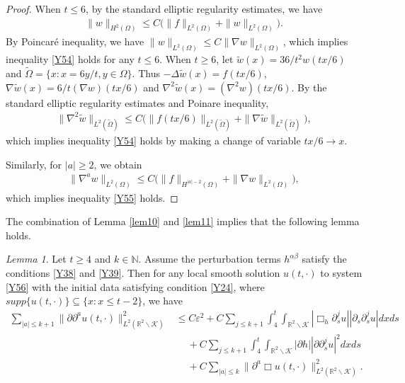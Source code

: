 \documentclass[11pt, reqno]{amsart}
\theoremstyle{definition}
\theoremstyle{remark}
\newtheorem{lem}[thm]{Lemma}
\theoremstyle{definition}
\numberwithin{equation}{section}
\numberwithin{equation}{section}
\def\leq{\leqslant}
\def\geq{\geqslant}
\begin{document}
\begin{proof}
When $t\leq6$, by the standard elliptic regularity estimates, we
have
\begin{align*}
\|w\|_{H^2(\Omega)}\leq
C\big(\|f\|_{L^2(\Omega)}+\|w\|_{L^2(\Omega)}\big).
\end{align*}
By Poincar\'{e} inequality, we have $\|w\|_{L^2(\Omega)}\leq C\|\nabla
w\|_{L^2(\Omega)}$, which implies inequality \eqref{Y54} holds for
any $t\leq6$. When $t\geq6$, let $\widetilde{w}(x)=36/t^2w(tx/6)$
and $\widetilde{\Omega}=\{x:x=6y/t,y\in\Omega\}$. Thus $-\Delta
\widetilde{w}(x)=f(tx/6)$, $\nabla\widetilde{w}(x)=6/t(\nabla
w)(tx/6)$ and $\nabla^2\widetilde{w}(x)=(\nabla^2 w)(tx/6)$. By the
standard elliptic regularity estimates and Poinare inequality,
\begin{align*}
\|\nabla^2\widetilde{w}\|_{L^2(\widetilde{\Omega})}\leq
C\big(\|f(tx/6)\|_{L^2(\widetilde{\Omega})}+\|\nabla
\widetilde{w}\|_{L^2(\widetilde{\Omega})}\big),
\end{align*}
which implies inequality \eqref{Y54} holds by making a change of
variable $tx/6\rightarrow x$.
\par Similarly, for $|a|\geq2$, we obtain
\begin{align*}
\|\nabla^aw\|_{L^2(\Omega)}\leq
C\big(\|f\|_{H^{|a|-2}(\Omega)}+\|\nabla w\|_{L^2(\Omega)}\big),
\end{align*}
which implies inequality \eqref{Y55} holds.
\end{proof}
The combination of Lemma \ref{lem10} and \ref{lem11} implies that the following lemma holds.
\begin{lem}\label{lem12}
Let $t\geq4$ and $k\in\mathbb N$.  Assume the perturbation terms
$h^{\alpha\beta}$ satisfy the conditions \eqref{Y38} and \eqref{Y39}.
Then for any local smooth solution $u(t,\cdot)$ to system \eqref{Y56}
with the initial data satisfying condition \eqref{Y24}, where
$supp\{u(t,\cdot)\}\subseteq\{x:x\leq t-2\}$, we have
\begin{align*}
\sum_{|a|\leq k+1}\|\partial\partial^au(t,\cdot)\|^2_{L^2(\mathbb
R^2\backslash\mathcal {K})}&\leq
C\varepsilon^2+C\sum_{j\leq k+1}\int_4^t\int_{\mathbb R^2\backslash\mathcal
{K}}|\Box_h
\partial_s^ju||\partial_s\partial_s^ju|dxds
\nonumber\\&\quad\ +C\sum_{j\leq k+1}\int_4^t\int_{\mathbb
R^2\backslash\mathcal {K}}|\partial h||\partial\partial_s^ju|^2dxds
\nonumber\\&\quad\ +C\sum_{|a|\leq k}\|\partial^a\Box
u(t,\cdot)\|^2_{L^2(\mathbb R^2\backslash\mathcal {K})}.
\end{align*}
\end{lem}
\end{document}
